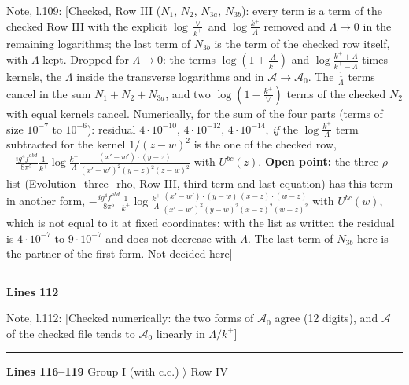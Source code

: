 \documentclass[10pt]{article}
\newenvironment{notebox}{\def\FrameCommand{{\color{notebar}\vrule width 1.5pt}\hspace{6pt}}\MakeFramed{\advance\hsize-\width\FrameRestore}\small}{\endMakeFramed}
\begin{document}
\begin{notebox}\textsf{\small Note, l.109:} [Checked, Row III ($N_{1}$, $N_{2}$, $N_{3a}$, $N_{3b}$): every term is a term of the checked Row III with the explicit $\log\frac{\vee}{k^{+}}$ and $\log\frac{k^{+}}{\Lambda}$ removed and $\Lambda\to0$ in the remaining logarithms; the last term of $N_{3b}$ is the term of the checked row itself, with $\Lambda$ kept. Dropped for $\Lambda\to0$: the terms $\log(1\pm\frac{\Lambda}{k^{+}})$ and $\log\frac{k^{+}+\Lambda}{k^{+}-\Lambda}$ times kernels, the $\Lambda$ inside the transverse logarithms and in $\mathcal{A}\to\mathcal{A}_{0}$. The $\frac{1}{\Lambda}$ terms cancel in the sum $N_{1}+N_{2}+N_{3a}$, and two $\log(1-\frac{k^{+}}{\vee})$ terms of the checked $N_{2}$ with equal kernels cancel. Numerically, for the sum of the four parts (terms of size $10^{-7}$ to $10^{-6}$): residual $4\cdot10^{-10}$, $4\cdot10^{-12}$, $4\cdot10^{-14}$, \emph{if} the $\log\frac{k^{+}}{\Lambda}$ term subtracted for the kernel $1/(z-w)^{2}$ is the one of the checked row, $-\frac{ig^{4}f^{abd}}{8\pi^{5}}\frac{1}{k^{+}}\log\frac{k^{+}}{\Lambda}\frac{(x'-w')\cdot(y-z)}{(x'-w')^{2}(y-z)^{2}(z-w)^{2}}$ with $U^{bc}(z)$. \textbf{Open point:} the three-$\rho$ list (Evolution\_three\_rho, Row III, third term and last equation) has this term in another form, $-\frac{ig^{4}f^{abd}}{8\pi^{5}}\frac{1}{k^{+}}\log\frac{k^{+}}{\Lambda}\frac{(x'-w')\cdot(y-w)\,(x-z)\cdot(w-z)}{(x'-w')^{2}(y-w)^{2}(x-z)^{2}(w-z)^{2}}$ with $U^{bc}(w)$, which is not equal to it at fixed coordinates: with the list as written the residual is $4\cdot10^{-7}$ to $9\cdot10^{-7}$ and does not decrease with $\Lambda$. The last term of $N_{3b}$ here is the partner of the first form. Not decided here]\end{notebox}
\par
{}\noindent\rule{\linewidth}{0.3pt}\par\noindent\textbf{Lines 112}\par
\begin{notebox}\textsf{\small Note, l.112:} [Checked numerically: the two forms of $\mathcal{A}_{0}$ agree (12 digits), and $\mathcal{A}$ of the checked file tends to $\mathcal{A}_{0}$ linearly in $\Lambda/k^{+}$]\end{notebox}
\noindent\rule{\linewidth}{0.3pt}\par\noindent\textbf{Lines 116--119} \quad \textsf{Group I (with c.c.) $\rangle$ Row IV} \par
\end{document}

